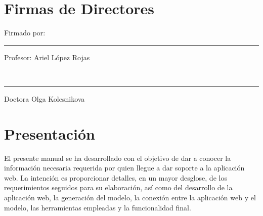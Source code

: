 \documentclass[12pt, a4paper, titlepage]{article}
\begin{document}
	\newpage
	\section*{Firmas de Directores}
	
	\vfill  %
	\noindent 
	\parbox[b]{0.4\linewidth}{%
		\strut 
		Firmado por: \\[3cm]%
		\hrule
		Profesor: Ariel López Rojas} 
	\hspace{1cm} %
	\parbox[b]{0.4\linewidth}{%
		\strut 
		\\[3cm]%
		\hrule
		Doctora Olga Kolesnikova} 
	\par\vspace{1cm} 
	\newpage
	\renewcommand\appendixpagename{Índice}
	\renewcommand\appendixtocname{Índice}
	\appendixpageoff
	\begin{appendices}
		\renewcommand*\contentsname{{\textcolor{azulescom}{Índice.}}}
		\tableofcontents
		\newpage
		\renewcommand*\listfigurename{{\textcolor{azulescom}{Índice de figuras.}}}
		\listoffigures
		\newpage
		\newpage
		\renewcommand*\listtablename{{\textcolor{azulescom}{Índice de cuadros.}}}
		\listoftables
		\newpage
	\end{appendices}
	
	\section{Presentación}
	El presente manual se ha desarrollado con el objetivo de dar a conocer la información necesaria requerida por quien llegue a dar soporte a la aplicación web. La intención es proporcionar detalles, en un mayor desglose, de los requerimientos seguidos para su elaboración, así como del desarrollo de la aplicación web, la generación del modelo, la conexión entre la aplicación web y el modelo, las herramientas empleadas y la funcionalidad final.
\end{document}
